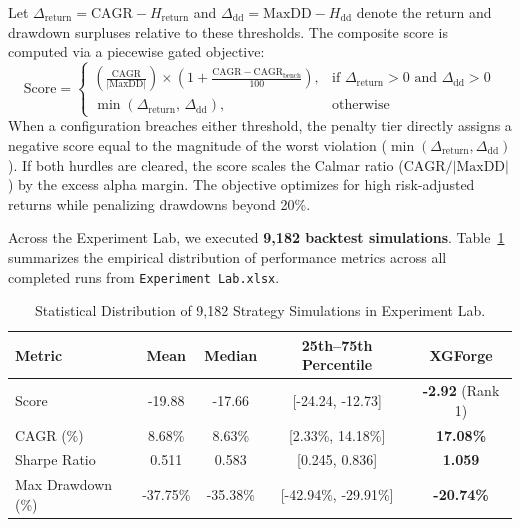 Let $\Delta_{\text{return}} = \text{CAGR} - H_{\text{return}}$ and $\Delta_{\text{dd}} = \text{MaxDD} - H_{\text{dd}}$ denote the return and drawdown surpluses relative to these thresholds. The composite score is computed via a piecewise gated objective:
\begin{equation}
    \text{Score} = 
    \begin{cases}
        \left(\frac{\text{CAGR}}{|\text{MaxDD}|}\right) \times \left(1 + \frac{\text{CAGR} - \text{CAGR}_{\text{bench}}}{100}\right), & \text{if } \Delta_{\text{return}} > 0 \text{ and } \Delta_{\text{dd}} > 0 \\[8pt]
        \min\left(\Delta_{\text{return}}, \, \Delta_{\text{dd}}\right), & \text{otherwise}
    \end{cases}
    \label{eq:apex_score}
\end{equation}
When a configuration breaches either threshold, the penalty tier directly assigns a negative score equal to the magnitude of the worst violation ($\min(\Delta_{\text{return}}, \Delta_{\text{dd}})$). If both hurdles are cleared, the score scales the Calmar ratio ($\text{CAGR} / |\text{MaxDD}|$) by the excess alpha margin. The objective optimizes for high risk-adjusted returns while penalizing drawdowns beyond 20\%.

Across the Experiment Lab, we executed \textbf{9,182 backtest simulations}. Table~\ref{tab:experiment_lab_stats} summarizes the empirical distribution of performance metrics across all completed runs from \texttt{Experiment Lab.xlsx}.

\begin{table}[htbp]
\centering
\caption{Statistical Distribution of 9,182 Strategy Simulations in Experiment Lab.}
\label{tab:experiment_lab_stats}
\begin{tabular}{lcccc}
\hline\hline
\textbf{Metric} & \textbf{Mean} & \textbf{Median} & \textbf{25th--75th Percentile} & \textbf{XGForge} \\
\hline
Score & -19.88 & -17.66 & [-24.24, -12.73] & \textbf{-2.92} (Rank 1) \\
CAGR (\%) & 8.68\% & 8.63\% & [2.33\%, 14.18\%] & \textbf{17.08\%} \\
Sharpe Ratio & 0.511 & 0.583 & [0.245, 0.836] & \textbf{1.059} \\
Max Drawdown (\%) & -37.75\% & -35.38\% & [-42.94\%, -29.91\%] & \textbf{-20.74\%} \\
\hline\hline
\end{tabular}
\end{table}

